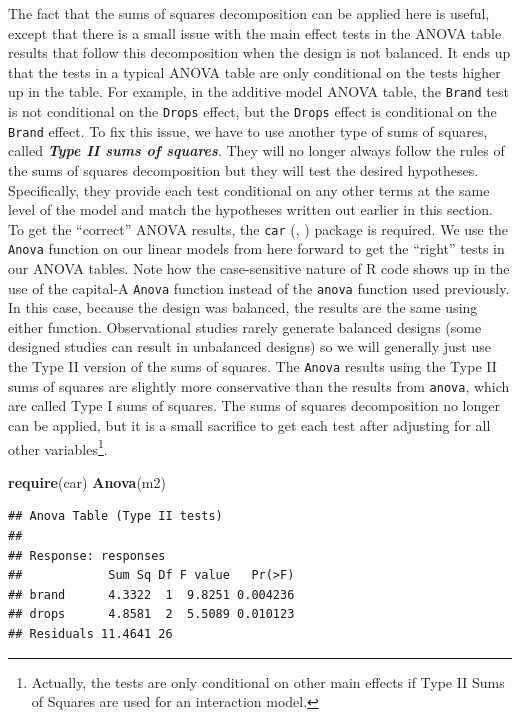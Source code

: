 \documentclass[]{book}
\newenvironment{Shaded}{\begin{snugshade}}{\end{snugshade}}
\newcommand{\KeywordTok}[1]{\textcolor[rgb]{0.13,0.29,0.53}{\textbf{#1}}}
\newcommand{\NormalTok}[1]{#1}
\let\rmarkdownfootnote\footnote%
\def\footnote{\protect\rmarkdownfootnote}
\theoremstyle{definition}
\theoremstyle{definition}
\theoremstyle{remark}
\begin{document}
The fact that the sums of squares decomposition can be applied here is
useful, except that there is a small issue with the main effect tests in
the ANOVA table results that follow this decomposition when the design
is not balanced. It ends up that the tests in a typical ANOVA table are
only conditional on the tests higher up in the table. For example, in
the additive model ANOVA table, the \texttt{Brand} test is not
conditional on the \texttt{Drops} effect, but the \texttt{Drops} effect
is conditional on the \texttt{Brand} effect. To fix this issue, we have
to use another type of sums of squares, called \textbf{\emph{Type II
sums of squares}}. They will no longer always follow the rules of the
sums of squares decomposition but they will test the desired hypotheses.
Specifically, they provide each test conditional on any other terms at
the same level of the model and match the hypotheses written out earlier
in this section. To get the ``correct'' ANOVA results, the \texttt{car}
(\citet{R-car}, \citet{Fox2011}) package is required. We use the
\texttt{Anova} function on our linear models from here forward to get
the ``right'' tests in our ANOVA tables. Note how the case-sensitive
nature of R code shows up in the use of the capital-A \texttt{Anova}
function instead of the \texttt{anova} function used previously. In this
case, because the design was balanced, the results are the same using
either function. Observational studies rarely generate balanced designs
(some designed studies can result in unbalanced designs) so we will
generally just use the Type II version of the sums of squares. The
\texttt{Anova} results using the Type II sums of squares are slightly
more conservative than the results from \texttt{anova}, which are called
Type I sums of squares. The sums of squares decomposition no longer can
be applied, but it is a small sacrifice to get each test after adjusting
for all other variables\footnote{Actually, the tests are only
  conditional on other main effects if Type II Sums of Squares are used
  for an interaction model.}.

\begin{Shaded}
\begin{Highlighting}[]
\KeywordTok{require}\NormalTok{(car)}
\KeywordTok{Anova}\NormalTok{(m2)}
\end{Highlighting}
\end{Shaded}

\begin{verbatim}
## Anova Table (Type II tests)
## 
## Response: responses
##            Sum Sq Df F value   Pr(>F)
## brand      4.3322  1  9.8251 0.004236
## drops      4.8581  2  5.5089 0.010123
## Residuals 11.4641 26
\end{verbatim}
\end{document}
